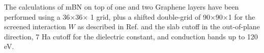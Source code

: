 The calculations of \acrshort{mBN} on top of one and two Graphene layers have been performed using a 36$\times$36$\times$ 1 grid, plus a shifted double-grid of 90$\times$90$\times$1 for the screened interaction $W$ as described in Ref.\cite{kmmerlander2012} and the slab cutoff in the out-of-plane direction, 7 Ha cutoff for the dielectric constant, and conduction bands up to 120 eV.

